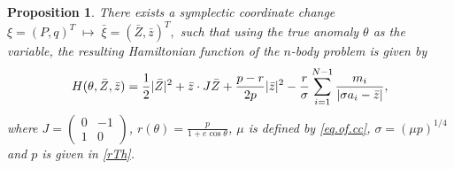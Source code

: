 \documentclass[11pt]{article}
\newtheorem{proposition}[lemma]{Proposition}
\def\lb{\label}
\def\th{{\theta}}
\def\sg{{\sigma}}
\begin{document}
\begin{proposition}\label{P2.1}
There exists a symplectic coordinate change
$
  \xi = (P,q)^T
    \;\mapsto\; \bar{\xi}
    = ( \bar{Z}, \bar{z})^T,$
such that using the true anomaly $\th$ as the variable,  the resulting Hamiltonian function of the
$n$-body problem is given by
\begin{align}\lb{eqn:red.Ham}
  H(\theta,\bar{Z},\bar{z})=\frac{1}{2}|\bar{Z}|^2 + \bar{z}\cdot J\bar{Z}
+ \frac{p-r}{2p}|\bar{z}|^2
- \frac{r}{\sg}\sum_{i=1}^{N-1}{m_i\over|\sg a_i-\bar{z}|},
\end{align}
where $J =( 
\begin{smallmatrix}
       0 &-1 \\ 1 & 0
\end{smallmatrix})$, $r(\th)=\frac{p}{1+e\cos\th}$,
$\mu$ is defined by \eqref{eq.of.cc}, $\sg=(\mu p)^{1/4}$ and $p$ is given in \eqref{rTh}.
\end{proposition}
\end{document}
